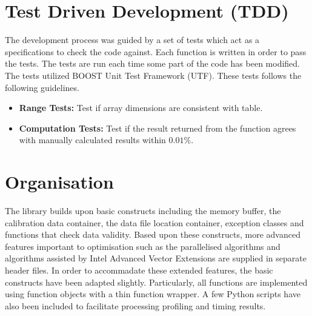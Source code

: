 \documentclass[journal]{IEEEtran}
\begin{document}
\section{Test Driven Development (TDD)} %

The development process was guided by a set of tests which act as a specifications to check the code against. Each function is written in order to pass the tests. The tests are run each time some part of the code has been modified. The tests utilized BOOST Unit Test Framework (UTF). These tests follows the following guidelines.
\begin{itemize}
 \item \textbf{Range Tests:} Test if array dimensions are consistent with table.
 \item \textbf{Computation Tests:} Test if the result returned from the function agrees with manually calculated results within $0.01\%$.	
\end{itemize}

\section{Organisation}	%
The library builds upon basic constructs including the memory buffer, the calibration data container, the data file location container, exception classes and functions that check data validity. Based upon these constructs, more advanced features important to optimisation such as the parallelised algorithms and algorithms assisted by Intel Advanced Vector Extensions are supplied in separate header files. In order to accommadate these extended features, the basic constructs have been adapted slightly. Particularly, all functions are implemented using function objects with a thin function wrapper. A few Python scripts have also been included to facilitate processing profiling and timing results.
\end{document}
